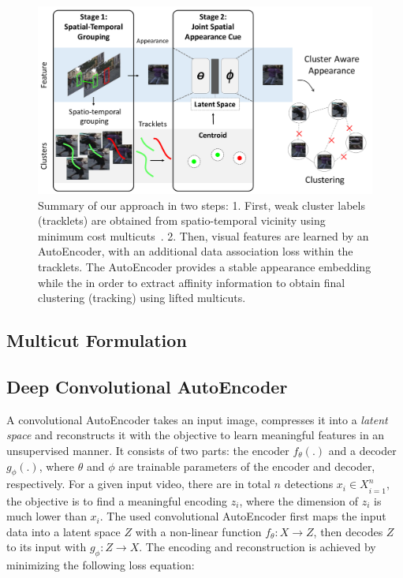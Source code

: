 \begin{figure}[t]
	\begin{center}
		\includegraphics[width=0.7\linewidth]{Fig_2_figure2.pdf}
	\end{center}
	\caption{Summary of our approach in two steps: 1. First, weak cluster labels (tracklets) are obtained from spatio-temporal vicinity using minimum cost multicuts~\cite{chopra-1993}. 2. Then, visual features are learned by an AutoEncoder, with an additional data association loss within the tracklets. The AutoEncoder provides a stable appearance embedding  while the in order to extract affinity information to obtain final clustering (tracking) using lifted multicuts.}
	\label{fig:figure0}
\vspace*{-5mm}
\end{figure}

\subsection{Multicut Formulation}
\label{subsec:multicut}



\subsection{Deep Convolutional AutoEncoder}
\label{subsec:autoencoder}
A convolutional AutoEncoder takes an input image, compresses it into a \textit{latent space} and reconstructs it with the objective to learn meaningful features in an unsupervised manner. 
It consists of two parts: the encoder $f_\theta(.)$ and a decoder $g_\phi(.)$, where $\theta$ and $\phi$ are trainable parameters of the encoder and decoder, respectively. 
For a given input video, there are in total $n$ detections ${x_i \in X}_{i=1}^n$, the objective is to find a meaningful encoding $z_i$, where the dimension of $z_i$ is much lower than $x_i$. The used convolutional AutoEncoder first maps the input data into a latent space $Z$ with a non-linear function $f_\theta: X \rightarrow Z$, then decodes $Z$ to its input with $g_\phi:Z\rightarrow X$. 
The encoding and reconstruction is achieved by minimizing the following loss equation:

